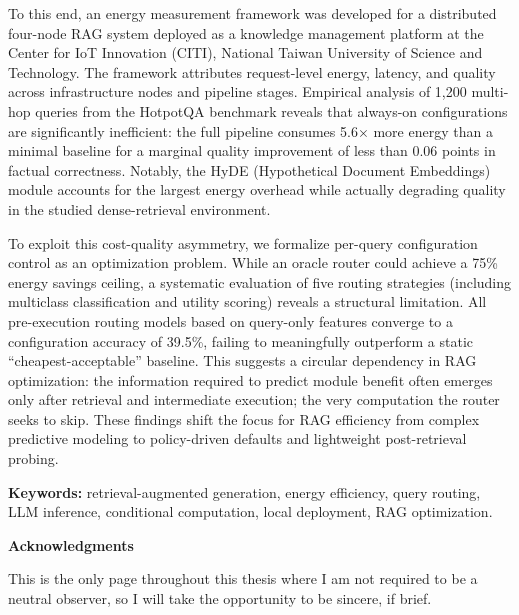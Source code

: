 To this end, an energy measurement framework was developed for a distributed
four-node RAG system deployed as a knowledge management platform at the Center
for IoT Innovation (CITI), National Taiwan University of Science and Technology.
The framework attributes request-level energy, latency, and quality across
infrastructure nodes and pipeline stages. Empirical analysis of 1,200 multi-hop
queries from the HotpotQA benchmark reveals that always-on configurations are
significantly inefficient: the full pipeline consumes 5.6$\times$ more energy
than a minimal baseline for a marginal quality improvement of less than 0.06
points in factual correctness. Notably, the HyDE (Hypothetical Document Embeddings)
module accounts for the largest energy overhead while actually degrading quality in
the studied dense-retrieval environment.

To exploit this cost-quality asymmetry, we formalize per-query configuration control
as an optimization problem. While an oracle router could achieve a 75\% energy savings
ceiling, a systematic evaluation of five routing strategies (including multiclass
classification and utility scoring) reveals a structural limitation. All pre-execution
routing models based on query-only features converge to a configuration accuracy of
39.5\%, failing to meaningfully outperform a static ``cheapest-acceptable'' baseline.
This suggests a circular dependency in RAG optimization: the information required
to predict module benefit often emerges only after retrieval and intermediate
execution; the very computation the router seeks to skip. These findings shift the
focus for RAG efficiency from complex predictive modeling to policy-driven defaults
and lightweight post-retrieval probing.

\vspace{1cm}
\textbf{Keywords:} retrieval-augmented generation, energy efficiency, query routing,
LLM inference, conditional computation, local deployment, RAG optimization.


\cleardoublepage
\begin{center}\textbf{\Large Acknowledgments}\end{center}
\bigskip

This is the only page throughout this thesis where I am not required to be a neutral observer, 
so I will take the opportunity to be sincere, if brief.

